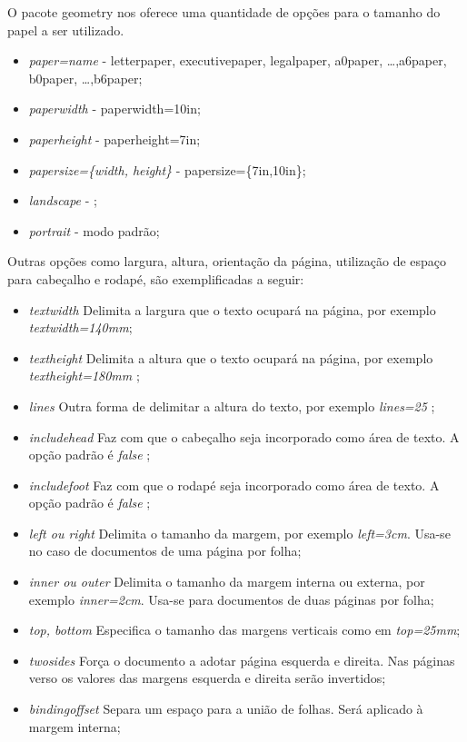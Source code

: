 O pacote geometry nos oferece uma quantidade de opções para o tamanho do papel a ser utilizado.

\begin{itemize}
    \item \emph{paper=name} - letterpaper, executivepaper, legalpaper, a0paper, \ldots ,a6paper, b0paper, \ldots ,b6paper;
    \item \emph{paperwidth} - paperwidth=10in;
    \item \emph{paperheight} - paperheight=7in;
    \item \emph{papersize=\{width, height\}} - papersize=\{7in,10in\};
    \item \emph{landscape} - ;
    \item \emph{portrait} - modo padrão;
\end{itemize}

Outras opções como largura, altura, orientação da página, utilização de espaço para cabeçalho e rodapé, são exemplificadas a seguir:
\begin{itemize}
    \item \emph{textwidth} Delimita a largura que o texto ocupará na página, por exemplo \emph{textwidth=140mm};
    \item \emph{textheight} Delimita a altura que o texto ocupará na página, por exemplo \emph{textheight=180mm} ;
    \item \emph{lines} Outra forma de delimitar a altura do texto, por exemplo \emph{lines=25} ;
    \item \emph{includehead} Faz com que o cabeçalho seja incorporado como área de texto. A opção padrão é \emph{false} ;
    \item \emph{includefoot} Faz com que o rodapé seja incorporado como área de texto. A opção padrão é \emph{false} ;
    \item \emph{left ou right} Delimita o tamanho da margem, por exemplo \emph{left=3cm}. Usa-se no caso de documentos de uma página por folha;
    \item \emph{inner ou outer} Delimita o tamanho da margem interna ou externa, por exemplo \emph{inner=2cm}. Usa-se para documentos de duas páginas por folha;
    \item \emph{top, bottom} Especifica o tamanho das margens verticais como em \emph{top=25mm};
    \item \emph{twosides} Força o documento a adotar página esquerda e direita. Nas páginas verso os valores das margens esquerda e direita serão invertidos;
    \item \emph{bindingoffset} Separa um espaço para a união de folhas. Será aplicado à margem interna;
\end{itemize}

